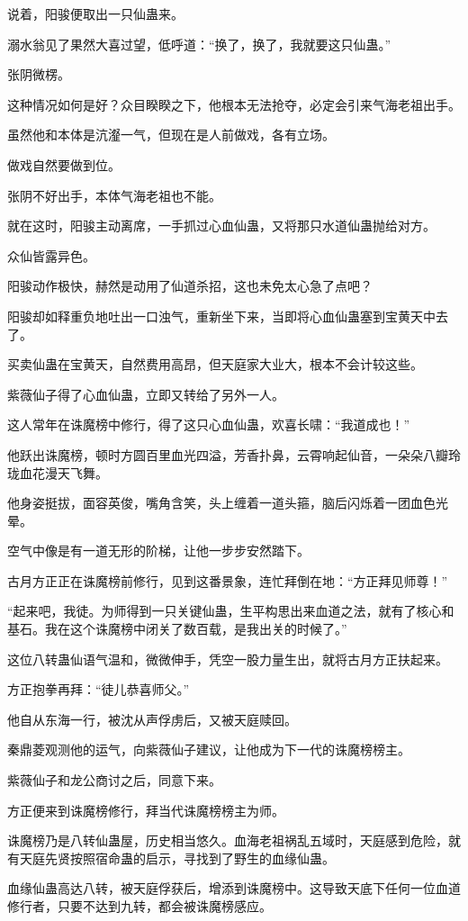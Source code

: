 \begin{this_body}
说着，阳骏便取出一只仙蛊来。

溺水翁见了果然大喜过望，低呼道：“换了，换了，我就要这只仙蛊。”

张阴微楞。

这种情况如何是好？众目睽睽之下，他根本无法抢夺，必定会引来气海老祖出手。

虽然他和本体是沆瀣一气，但现在是人前做戏，各有立场。

做戏自然要做到位。

张阴不好出手，本体气海老祖也不能。

就在这时，阳骏主动离席，一手抓过心血仙蛊，又将那只水道仙蛊抛给对方。

众仙皆露异色。

阳骏动作极快，赫然是动用了仙道杀招，这也未免太心急了点吧？

阳骏却如释重负地吐出一口浊气，重新坐下来，当即将心血仙蛊塞到宝黄天中去了。

买卖仙蛊在宝黄天，自然费用高昂，但天庭家大业大，根本不会计较这些。

紫薇仙子得了心血仙蛊，立即又转给了另外一人。

这人常年在诛魔榜中修行，得了这只心血仙蛊，欢喜长啸：“我道成也！”

他跃出诛魔榜，顿时方圆百里血光四溢，芳香扑鼻，云霄响起仙音，一朵朵八瓣玲珑血花漫天飞舞。

他身姿挺拔，面容英俊，嘴角含笑，头上缠着一道头箍，脑后闪烁着一团血色光晕。

空气中像是有一道无形的阶梯，让他一步步安然踏下。

古月方正正在诛魔榜前修行，见到这番景象，连忙拜倒在地：“方正拜见师尊！”

“起来吧，我徒。为师得到一只关键仙蛊，生平构思出来血道之法，就有了核心和基石。我在这个诛魔榜中闭关了数百载，是我出关的时候了。”

这位八转蛊仙语气温和，微微伸手，凭空一股力量生出，就将古月方正扶起来。

方正抱拳再拜：“徒儿恭喜师父。”

他自从东海一行，被沈从声俘虏后，又被天庭赎回。

秦鼎菱观测他的运气，向紫薇仙子建议，让他成为下一代的诛魔榜榜主。

紫薇仙子和龙公商讨之后，同意下来。

方正便来到诛魔榜修行，拜当代诛魔榜榜主为师。

诛魔榜乃是八转仙蛊屋，历史相当悠久。血海老祖祸乱五域时，天庭感到危险，就有天庭先贤按照宿命蛊的启示，寻找到了野生的血缘仙蛊。

血缘仙蛊高达八转，被天庭俘获后，增添到诛魔榜中。这导致天底下任何一位血道修行者，只要不达到九转，都会被诛魔榜感应。


\end{this_body}
